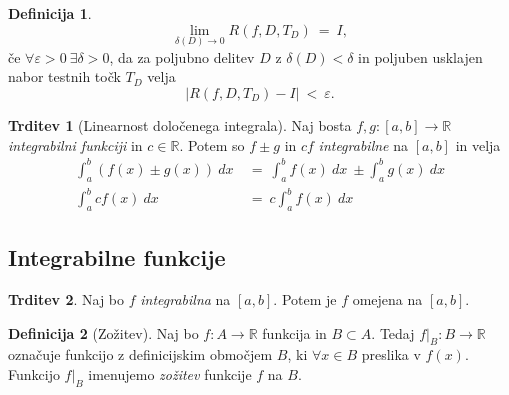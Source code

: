 \documentclass[11pt]{article}
\theoremstyle{definition}
\newtheorem{definicija}{Definicija}[section]
\theoremstyle{definition}
\newtheorem{trditev}{Trditev}[section]
\theoremstyle{definition}
\theoremstyle{theorem}
\begin{document}
\begin{definicija}

$$\lim_{\delta(D) \rightarrow 0} R(f, D, T_D) ~=~ I,$$
če $\forall \varepsilon > 0 ~ \exists \delta > 0$, da za poljubno delitev $D$ z $\delta(D) < \delta$ in poljuben usklajen nabor testnih točk $T_D$ velja
$$|R(f, D, T_D) - I| ~<~ \varepsilon.$$ 

\end{definicija}
\vspace{0.5cm}

\begin{trditev}[Linearnost določenega integrala]

Naj bosta $f, g: [a, b] \rightarrow \mathbb{R}$ \textit{integrabilni funkciji} in $c \in \mathbb{R}$. Potem so $f \pm g$ in $cf$ \textit{integrabilne} na $[a, b]$ in velja
\begin{align*}
\int_a^b \left( f(x) \pm g(x) \right)~dx ~&=~ \int_a^b f(x)~dx ~\pm \int_a^b g(x)~dx \\
\int_a^b cf(x)~dx ~&=~ c\int_a^b f(x)~dx 
\end{align*}

\end{trditev}
\vspace{0.5cm}


\subsection{Integrabilne funkcije}
\vspace{0.5cm}

\begin{trditev}

Naj bo $f$ \textit{integrabilna} na $[a, b]$. Potem je $f$ omejena na $[a, b]$.

\end{trditev}
\vspace{0.5cm}

\begin{definicija}[Zožitev]

Naj bo $f:A \rightarrow \mathbb{R}$ funkcija in $B \subset A$. Tedaj $f |_B: B \rightarrow \mathbb{R}$ označuje funkcijo z definicijskim območjem $B$, ki $\forall x \in B$ preslika v $f(x)$. Funkcijo $f |_B$ imenujemo \textit{zožitev} funkcije $f$ na $B$.   

\end{definicija}
\vspace{0.5cm}
\end{document}

